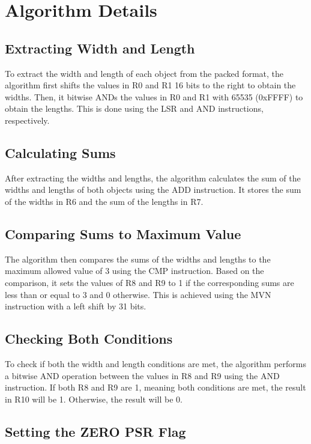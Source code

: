\section{Algorithm Details}

\subsection{Extracting Width and Length}

To extract the width and length of each object from the packed format, the algorithm first shifts the values in R0 and R1 16 bits to the right to obtain the widths. Then, it bitwise ANDs the values in R0 and R1 with 65535 (0xFFFF) to obtain the lengths. This is done using the LSR and AND instructions, respectively.

\subsection{Calculating Sums}

After extracting the widths and lengths, the algorithm calculates the sum of the widths and lengths of both objects using the ADD instruction. It stores the sum of the widths in R6 and the sum of the lengths in R7.

\subsection{Comparing Sums to Maximum Value}

The algorithm then compares the sums of the widths and lengths to the maximum allowed value of 3 using the CMP instruction. Based on the comparison, it sets the values of R8 and R9 to 1 if the corresponding sums are less than or equal to 3 and 0 otherwise. This is achieved using the MVN instruction with a left shift by 31 bits.

\subsection{Checking Both Conditions}

To check if both the width and length conditions are met, the algorithm performs a bitwise AND operation between the values in R8 and R9 using the AND instruction. If both R8 and R9 are 1, meaning both conditions are met, the result in R10 will be 1. Otherwise, the result will be 0.

\subsection{Setting the ZERO PSR Flag}


